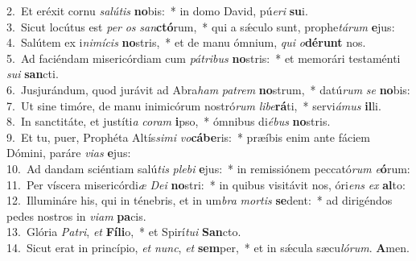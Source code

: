 {2.~}Et eréxit cornu \textit{sa}\textit{lú}\textit{tis} \textbf{no}bis:~* in domo David, pú\textit{e}\textit{ri} \textbf{su}i.\\
{3.~}Sicut locútus est \textit{per} \textit{os} \textit{san}\textbf{ctó}rum,~* qui a sǽculo sunt, prophe\textit{tá}\textit{rum} \textbf{e}jus:\\
{4.~}Salútem ex i\textit{ni}\textit{mí}\textit{cis} \textbf{no}stris,~* et de manu ómnium, \textit{qui} \textit{o}\textbf{dé}\textbf{runt} nos.\\
{5.~}Ad faciéndam misericórdiam cum \textit{pá}\textit{tri}\textit{bus} \textbf{no}stris:~* et memorári testaménti \textit{su}\textit{i} \textbf{san}cti.\\
{6.~}Jusjurándum, quod jurávit ad Abra\textit{ham} \textit{pa}\textit{trem} \textbf{no}strum,~* datú\textit{rum} \textit{se} \textbf{no}bis:\\
{7.~}Ut sine timóre, de manu inimicórum nostró\textit{rum} \textit{li}\textit{be}\textbf{rá}ti,~* servi\textit{á}\textit{mus} \textbf{il}li.\\
{8.~}In sanctitáte, et justíti\textit{a} \textit{co}\textit{ram} \textbf{i}pso,~* ómnibus di\textit{é}\textit{bus} \textbf{no}stris.\\
{9.~}Et tu, puer, Prophéta Altís\textit{si}\textit{mi} \textit{vo}\textbf{cá}\textbf{be}ris:~* præíbis enim ante fáciem Dómini, paráre \textit{vi}\textit{as} \textbf{e}jus:\\
{10.~}Ad dandam sciéntiam salú\textit{tis} \textit{ple}\textit{bi} \textbf{e}jus:~* in remissiónem peccató\textit{rum} \textit{e}\textbf{ó}rum:\\
{11.~}Per víscera misericórdi\textit{æ} \textit{De}\textit{i} \textbf{no}stri:~* in quibus visitávit nos, óri\textit{ens} \textit{ex} \textbf{al}to:\\
{12.~}Illumináre his, qui in ténebris, et in um\textit{bra} \textit{mor}\textit{tis} \textbf{se}dent:~* ad dirigéndos pedes nostros in \textit{vi}\textit{am} \textbf{pa}cis.\\
{13.~}Glória \textit{Pa}\textit{tri}, \textit{et} \textbf{Fí}\textbf{li}o,~* et Spirí\textit{tu}\textit{i} \textbf{San}cto.\\
{14.~}Sicut erat in princípio, \textit{et} \textit{nunc}, \textit{et} \textbf{sem}per,~* et in sǽcula sæcu\textit{ló}\textit{rum}. \textbf{A}men.\\
